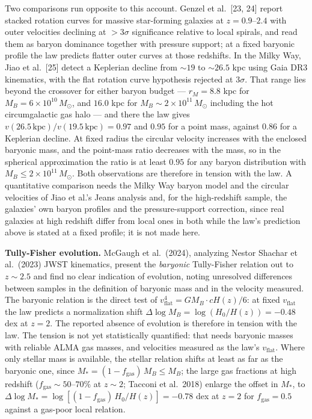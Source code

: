 \documentclass[
]{article}
\begin{document}
Two comparisons run opposite to this account. Genzel et al.~{[}23, 24{]}
report stacked rotation curves for massive star-forming galaxies at
\(z = 0.9\text{–}2.4\) with outer velocities declining at \(> 3\sigma\)
significance relative to local spirals, and read them as baryon
dominance together with pressure support; at a fixed baryonic profile
the law predicts flatter outer curves at those redshifts. In the Milky
Way, Jiao et al.~{[}25{]} detect a Keplerian decline from \(\sim 19\) to
\(\sim 26.5\) kpc using Gaia DR3 kinematics, with the flat rotation
curve hypothesis rejected at \(3\sigma\). That range lies beyond the
crossover for either baryon budget --- \(r_M = 8.8\) kpc for
\(M_B = 6 \times 10^{10}\,M_\odot\), and \(16.0\) kpc for
\(M_B \sim 2 \times 10^{11}\,M_\odot\) including the hot circumgalactic
gas halo --- and there the law gives
\(v(26.5\,\text{kpc})/v(19.5\,\text{kpc}) = 0.97\) and \(0.95\) for a
point mass, against \(0.86\) for a Keplerian decline. At fixed radius
the circular velocity increases with the enclosed baryonic mass, and the
point-mass ratio decreases with the mass, so in the spherical
approximation the ratio is at least \(0.95\) for any baryon distribution
with \(M_B \leq 2 \times 10^{11}\,M_\odot\). Both observations are
therefore in tension with the law. A quantitative comparison needs the
Milky Way baryon model and the circular velocities of Jiao et al.'s
Jeans analysis and, for the high-redshift sample, the galaxies' own
baryon profiles and the pressure-support correction, since real galaxies
at high redshift differ from local ones in both while the law's
prediction above is stated at a fixed profile; it is not made here.

\textbf{Tully-Fisher evolution.} McGaugh et al.~(2024), analyzing Nestor
Shachar et al.~(2023) JWST kinematics, present the \emph{baryonic}
Tully-Fisher relation out to \(z \sim 2.5\) and find no clear indication
of evolution, noting unresolved differences between samples in the
definition of baryonic mass and in the velocity measured. The baryonic
relation is the direct test of
\(v_{\text{flat}}^4 = GM_B \cdot cH(z)/6\): at fixed \(v_{\text{flat}}\)
the law predicts a normalization shift
\(\Delta\log M_B = \log(H_0/H(z)) = -0.48\) dex at \(z = 2\). The
reported absence of evolution is therefore in tension with the law. The
tension is not yet statistically quantified: that needs baryonic masses
with reliable ALMA gas masses, and velocities measured as the law's
\(v_{\text{flat}}\). Where only stellar mass is available, the stellar
relation shifts at least as far as the baryonic one, since
\(M_* = (1-f_{\text{gas}})\,M_B \leq M_B\); the large gas fractions at
high redshift (\(f_{\text{gas}} \sim 50\text{–}70\%\) at \(z \sim 2\);
Tacconi et al.~2018) enlarge the offset in \(M_*\), to
\(\Delta\log M_* = \log[(1-f_{\text{gas}})\,H_0/H(z)] = -0.78\) dex at
\(z = 2\) for \(f_{\text{gas}} = 0.5\) against a gas-poor local
relation.
\end{document}
